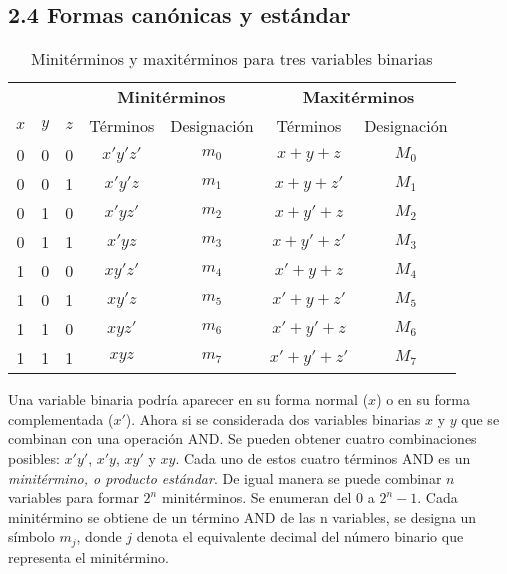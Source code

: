 \subsection*{2.4 Formas can\'{o}nicas y est\'{a}ndar}
\begin{table}[h]
    \centering
    \begin{tabular}{ccccccc}
        \toprule                                      &     &     &
        \multicolumn{2}{c}{\textbf{Minit\'{e}rminos}} &
        \multicolumn{2}{c}{\textbf{Maxit\'{e}rminos}}                                                                                 \\
        \cmidrule{4-5} \cmidrule{6-7}
        $x$                                           & $y$ & $z$ & T\'{e}rminos & Designaci\'{o}n & T\'{e}rminos   & Designaci\'{o}n \\ \midrule 0 & 0 & 0 & $x'y'z'$ & $m_0$ & $x + y + z$ & $M_0$\\
        0                                             & 0   & 1   & $x'y'z$      & $m_1$           & $x + y + z'$   & $M_1$           \\
        0                                             & 1   & 0   & $x'yz'$      & $m_2$           & $x + y' + z$   & $M_2$           \\
        0                                             & 1   & 1   & $x'yz$       & $m_3$           & $x + y' + z'$  & $M_3$           \\
        1                                             & 0   & 0   & $xy'z'$      & $m_4$           & $x' + y + z$   & $M_4$           \\
        1                                             & 0   & 1   & $xy'z$       & $m_5$           & $x' + y + z'$  & $M_5$           \\
        1                                             & 1   & 0   & $xyz'$       & $m_6$           & $x' + y'+ z$   & $M_6$           \\
        1                                             & 1   & 1   & $xyz$        & $m_7$           & $x' + y' + z'$ & $M_7$           \\
        \bottomrule
    \end{tabular}
    \caption{Minit\'{e}rminos y maxit\'{e}rminos para tres variables binarias}
    \label{tab:miniterminos_maxiterminos}
\end{table}

Una variable binaria podr\'{i}a aparecer en su forma normal ($x$) o en su forma
complementada ($x'$). Ahora si se considerada dos variables binarias $x$ y $y$
que se combinan con una operaci\'{o}n AND. Se pueden obtener cuatro
combinaciones posibles: $x'y'$, $x'y$, $xy'$ y $xy$. Cada uno de estos cuatro
t\'{e}rminos AND es un \textit{minit\'{e}rmino, o producto est\'{a}ndar}. De
igual manera se puede combinar $n$ variables para formar $2^n$ minit\'{e}rminos.
Se enumeran del 0 a $2^n - 1$. Cada minit\'{e}rmino se obtiene de un t\'{e}rmino
AND de las n variables, se designa un s\'{i}mbolo $m_j$, donde $j$ denota el
equivalente decimal del n\'{u}mero binario que representa el minit\'{e}rmino.

